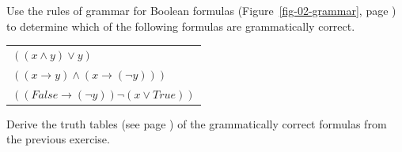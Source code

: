 \begin{ExerciseList}

\Exercise Use the rules of grammar for Boolean formulas (Figure~\ref{fig-02-grammar}, page \pageref{fig-02-grammar})
to determine which of the following formulas are grammatically correct.
\begin{center}
\begin{tabular}{l}
$((x \wedge y) \vee y )$ \\
$((x \rightarrow y) \wedge (x \rightarrow (\neg y)))$ \\
$((False \rightarrow (\neg y)) \neg (x \vee True))$ \\
\end{tabular}
\end{center}


\Exercise Derive the truth tables (see page \pageref{truth-tables}) of the grammatically correct formulas from the previous exercise.


\end{ExerciseList}
